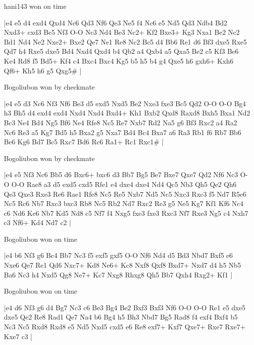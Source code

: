 \showboard

hani143 won on time

\makegametitle
|e4 e5 d4 exd4 Qxd4 Nc6 Qd3 Nf6 Qe3 Ne5 f4 Nc6 e5 Nd5 Qd3 Ndb4 Bd2 Nxd3+ cxd3 Bc5 Nf3 O-O Nc3 Nd4 Be3 Nc2+ Kf2 Bxe3+ Kg3 Nxa1 Be2 Nc2 Bd1 Nd4 Ne2 Nxe2+ Bxe2 Qe7 Ne1 Re8 Nc2 Bc5 d4 Bb6 Re1 d6 Bf3 dxe5 Rxe5 Qd7 h4 Rxe5 dxe5 Bd4 Nxd4 Qxd4 b4 Qb2 a4 Qxb4 a5 Qxa5 Be2 c5 Kf3 Be6 Ke4 Rd8 f5 Bd5+ Kf4 c4 Bxc4 Bxc4 Kg5 b5 h5 b4 g4 Qxe5 h6 gxh6+ Kxh6 Qf6+ Kh5 h6 g5 Qxg5\#  |

\showboard

Bogoliubon won by checkmate

\makegametitle
|e4 e5 d3 Nc6 Nf3 Nf6 Be3 d5 exd5 Nxd5 Be2 Nxe3 fxe3 Bc5 Qd2 O-O O-O Bg4 h3 Bh5 d4 exd4 exd4 Nxd4 Nxd4 Bxd4+ Kh1 Bxb2 Qxd8 Raxd8 Bxh5 Bxa1 Nd2 Bc3 Ne4 Bd4 Ng5 Bf6 Ne4 Rfe8 Nc5 Re7 Nxb7 Rd2 Na5 g6 Bf3 Rxc2 a4 Ra2 Nc6 Re3 a5 Kg7 Bd5 h5 Bxa2 g5 Nxa7 Bd4 Bc4 Bxa7 a6 Ra3 Rb1 f6 Rb7 Bb6 Be6 Kg6 Bd7 Bc5 Rxc7 Bd6 Rc6 Ra1+ Rc1 Rxc1\#  |

\showboard

Bogoliubon won by checkmate

\makegametitle
|e4 e5 Nf3 Nc6 Bb5 d6 Bxc6+ bxc6 d3 Bb7 Bg5 Be7 Bxe7 Qxe7 Qd2 Nf6 Nc3 O-O O-O Rae8 a3 d5 exd5 cxd5 Rfe1 e4 dxe4 dxe4 Nd4 Qc5 Nb3 Qh5 Qe2 Qh6 Qe3 Qxe3 Rxe3 Re6 Rae1 Rfe8 Nc5 Re5 Nxb7 Nd5 Nc5 Nxc3 Rxc3 f5 Nd7 R5e6 Nc5 Rc6 Nb7 Rxc3 bxc3 Rb8 Nc5 Rb2 Nd7 Rxc2 Re3 g5 Ne5 Kg7 Kf1 Kf6 Nc4 c6 Nd6 Ke6 Nb7 Kd5 Nd8 c5 Nf7 f4 Nxg5 fxe3 fxe3 Rxc3 Nf7 Rxe3 Ng5 c4 Nxh7 c3 Nf6+ Kd4 Nd7 c2  |

\showboard

Bogoliubon won on time

\makegametitle
|e4 b6 Nf3 g6 Bc4 Bb7 Nc3 f5 exf5 gxf5 O-O Nf6 Nd4 d5 Bd3 Nbd7 Bxf5 e6 Nxe6 Qe7 Re1 Qd6 Nxc7+ Kd8 Ne6+ Kc8 Nxf8 Qxf8 Bxd7+ Nxd7 d4 h5 Nb5 Ba6 Nc3 h4 Nxd5 Qg8 Ne7+ Kc7 Nxg8 Rhxg8 Qh5 Bb7 Qxh4 Rxg2+ Kf1  |

\showboard

Bogoliubon won on time

\makegametitle
|e4 d6 Nf3 g6 d4 Bg7 Nc3 c6 Be3 Bg4 Be2 Bxf3 Bxf3 Nf6 O-O O-O Re1 e5 dxe5 dxe5 Qe2 Re8 Rad1 Qe7 Na4 b6 Bg4 h5 Bh3 Nbd7 Bg5 Rad8 f4 exf4 Bxf4 b5 Nc3 Nc5 Rxd8 Rxd8 e5 Nd5 Nxd5 cxd5 e6 Re8 exf7+ Kxf7 Qxe7+ Rxe7 Rxe7+ Kxe7 c3  |

